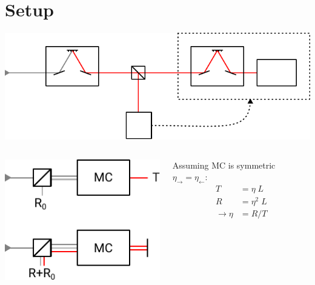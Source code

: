 \section{Setup}
\begin{frame}
	\centering
	\includegraphics{./figures/setup.pdf}
\end{frame}





\begin{frame}
	\begin{columns}
		\centering
		\includegraphics{figures/setup single monochromator.pdf}

		Assuming MC is symmetric $\eta_\rightarrow = \eta_\leftarrow$:\\
		\begin{align*}
			T &= \eta\; L \\
			R &= \eta^2\;L\\
			\rightarrow \eta &= R /T
		\end{align*}
	\end{columns}
\end{frame}